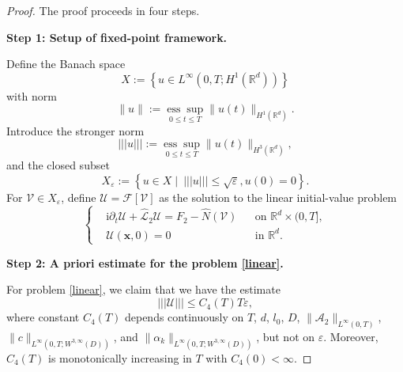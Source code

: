 \documentclass[11pt,reqno,oneside]{amsart}
\numberwithin{equation}{section}
\theoremstyle{definition}
\theoremstyle{remark}
\numberwithin{equation}{section}
\begin{document}
	\begin{proof}The proof proceeds in four steps.
		
		\medskip
		\textbf{Step 1: Setup of fixed-point framework.} 
		
		Define the Banach space
		$$
		X:=\left\{{u} \in L^{\infty}\left(0, T ; H^1\left(\mathbb{R}^d\right)\right) \right\}
		$$
		with norm
		$$
		\|{u}\|:=\underset{0 \leq t \leq T}{\operatorname{ess} \sup } \|{u}(t)\|_{H^1\left(\mathbb{R}^d\right)}.
		$$
		Introduce the stronger norm 
		$$
		|||{u}|||:=\underset{0 \leq t \leq T}{\operatorname{ess} \sup }\|{u}(t)\|_{H^3\left(\mathbb{R}^d\right)},
		$$
		and the closed subset
		$$
		X_\varepsilon:=\left\{{u} \in X \mid\ ||| {u}||| \leq \sqrt{\varepsilon},{u}(0)=0\right\} .
		$$
		For \(\mathscr{V} \in X_\varepsilon\), define \(\mathscr{U} = \mathscr{F}[\mathscr{V}]\) as the solution to the linear initial-value problem
		\begin{equation}\label{linear}
			\left\{
			\begin{aligned}
				&\mathrm{i}\partial_t \mathscr{U}+\hat{\mathcal{L}}_2 \mathscr{U}= F_2 -  \hat{N}(\mathscr{V}) &&\text{on } \mathbb{R}^d \times (0,T], \\
				&\mathscr{U}(\mathbf{x},0) = 0&& \text{in } \mathbb{R}^d.
			\end{aligned}
			\right.
		\end{equation}
		
		\medskip
		\textbf{Step 2: A priori estimate for the problem \eqref{linear}.}
		
		For problem \eqref{linear}, we claim that we have the estimate 
		\begin{equation}\label{key estimate}
			|||\mathscr{U}|||\leqslant C_4(T)T\varepsilon,
		\end{equation}
		where constant \(C_4(T)\) depends continuously on \(T\), \(d\), \(l_0\), \(D\), \(\|\mathscr{A}_2\|_{L^{\infty}(0,T)}\), \(\| c\|_{L^{\infty}(0,T; W^{3,\infty}(D))}\), and \(\|\alpha_k\|_{L^{\infty}(0,T; W^{3,\infty}(D))}\), but not on \(\varepsilon\). Moreover, \(C_4(T)\) is monotonically increasing in \(T\) with \(C_4(0) < \infty\).
		

\end{proof}
\end{document}

